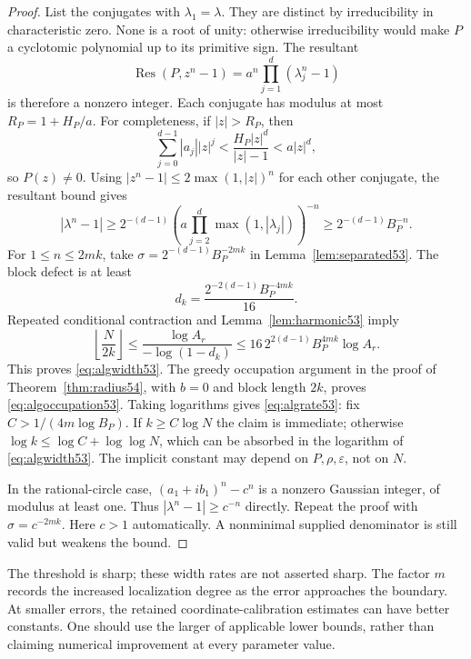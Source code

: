\begin{proof}
List the conjugates with $\lambda_1=\lambda$. They are distinct by irreducibility in characteristic zero. None is a root of unity: otherwise irreducibility would make $P$ a cyclotomic polynomial up to its primitive sign. The resultant
\[
 \operatorname{Res}(P,z^n-1)=a^n\prod_{j=1}^d(\lambda_j^n-1)
\]
is therefore a nonzero integer. Each conjugate has modulus at most $R_P=1+H_P/a$. For completeness, if $|z|>R_P$, then
\[
 \sum_{j=0}^{d-1}|a_j||z|^j
 <\frac{H_P|z|^d}{|z|-1}<a|z|^d,
\]
so $P(z)\ne0$. Using $|z^n-1|\le2\max(1,|z|)^n$ for each other conjugate, the resultant bound gives
\begin{equation}\label{eq:resultant53}
 |\lambda^n-1|\ge
 2^{-(d-1)}\left(a\prod_{j=2}^d\max(1,|\lambda_j|)\right)^{-n}
 \ge 2^{-(d-1)}B_P^{-n}.
\end{equation}
For $1\le n\le2mk$, take $\sigma=2^{-(d-1)}B_P^{-2mk}$ in Lemma~\ref{lem:separated53}. The block defect is at least
\[
                  d_k=\frac{2^{-2(d-1)}B_P^{-4mk}}{16}.
\]
Repeated conditional contraction and Lemma~\ref{lem:harmonic53} imply
\[
 \left\lfloor\frac{N}{2k}\right\rfloor
 \le \frac{\log A_r}{-\log(1-d_k)}
 \le 16\,2^{2(d-1)}B_P^{4mk}\log A_r.
\]
This proves \eqref{eq:algwidth53}. The greedy occupation argument in the proof of Theorem~\ref{thm:radius54}, with $b=0$ and block length $2k$, proves \eqref{eq:algoccupation53}. Taking logarithms gives \eqref{eq:algrate53}: fix $C>1/(4m\log B_P)$. If $k\ge C\log N$ the claim is immediate; otherwise $\log k\le\log C+\log\log N$, which can be absorbed in the logarithm of \eqref{eq:algwidth53}. The implicit constant may depend on $P,\rho,\varepsilon$, not on $N$.

In the rational-circle case, $(a_1+ib_1)^n-c^n$ is a nonzero Gaussian integer, of modulus at least one. Thus $|\lambda^n-1|\ge c^{-n}$ directly. Repeat the proof with $\sigma=c^{-2mk}$. Here $c>1$ automatically. A nonminimal supplied denominator is still valid but weakens the bound.
\end{proof}
The threshold is sharp; these width rates are not asserted sharp. The factor $m$ records the increased localization degree as the error approaches the boundary. At smaller errors, the retained coordinate-calibration estimates can have better constants. One should use the larger of applicable lower bounds, rather than claiming numerical improvement at every parameter value.

